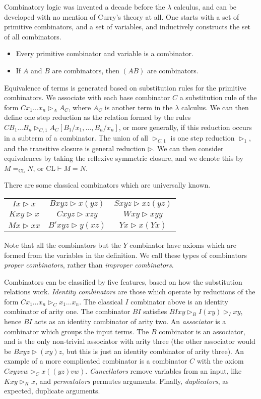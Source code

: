 Combinatory logic was invented a decade before the $\lambda$ calculus, and can be developed with no mention of Curry's theory at all. One starts with a set of primitive combinators, and a set of variables, and inductively constructs the set of all combinators.
%
\begin{itemize}
    \item Every primitive combinator and variable is a combinator.
    \item If $A$ and $B$ are combinators, then $(AB)$ are combinators.
\end{itemize}
%
Equivalence of terms is generated based on substitution rules for the primitive combinators. We associate with each base combinator $C$ a substitution rule of the form $Cx_1 \dots x_n \rhd_A A_C$, where $A_C$ is another term in the $\lambda$ calculus. We can then define one step reduction as the relation formed by the rules $CB_1 \dots B_n \rhd_{C,1} A_C[B_1/x_1, \dots, B_n/x_n]$, or more generally, if this reduction occurs in a subterm of a combinator. The union of all $\rhd_{C,1}$ is one step reduction $\rhd_1$, and the transitive closure is general reduction $\rhd$. We can then consider equivalences by taking the reflexive symmetric closure, and we denote this by $M =_{\text{CL}} N$, or $\text{CL} \vdash M = N$.

\begin{example}
    There are some classical combinators which are universally known.
    \begin{center}
    \begin{tabular}{ c c c }
    $Ix \rhd x$ & $Bxyz \rhd x(yz)$ & $Sxyz \rhd xz(yz)$ \\ 
    $Kxy \rhd x$ & $Cxyz \rhd xzy$ & $Wxy \rhd xyy$ \\  
    $Mx \rhd xx$ & $B'xyz \rhd y(xz)$ & $Yx \rhd x(Yx)$
    \end{tabular}
    \end{center}
    Note that all the combinators but the $Y$ combinator have axioms which are formed from the variables in the definition. We call these types of combinators \emph{proper combinators}, rather than \emph{improper combinators}.
\end{example}

Combinators can be classified by five features, based on how the substitution relations work. \emph{Identity combinators} are those which operate by reductions of the form $Cx_1 \dots x_n \rhd_C x_1 \dots x_n$. The classical $I$ combinator above is an identity combinator of arity one. The combinator $BI$ satisfies $BIxy \rhd_B I(xy) \rhd_I xy$, hence $BI$ acts as an identity combinator of arity two. An \emph{associator} is a combinator which groups the input terms. The $B$ combinator is an associator, and is the only non-trivial associator with arity three (the other associator would be $Bxyz \rhd (xy)z$, but this is just an identity combinator of arity three). An example of a more complicated combinator is a combinator $C$ with the axiom $Cxyzvw \rhd_C x((yz)vw)$. \emph{Cancellators} remove variables from an input, like $Kxy \rhd_K x$, and \emph{permutators} permutes arguments. Finally, \emph{duplicators}, as expected, duplicate arguments.

